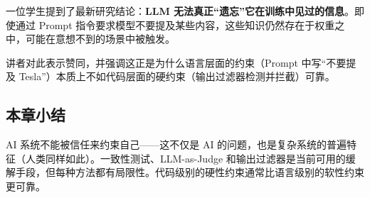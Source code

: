 一位学生提到了最新研究结论：\textbf{LLM 无法真正``遗忘''它在训练中见过的信息}。即使通过 Prompt 指令要求模型不要提及某些内容，这些知识仍然存在于权重之中，可能在意想不到的场景中被触发。

讲者对此表示赞同，并强调这正是为什么语言层面的约束（Prompt 中写``不要提及 Tesla''）本质上不如代码层面的硬约束（输出过滤器检测并拦截）可靠。

\subsection{本章小结}

AI 系统不能被信任来约束自己——这不仅是 AI 的问题，也是复杂系统的普遍特征（人类同样如此）。一致性测试、LLM-as-Judge 和输出过滤器是当前可用的缓解手段，但每种方法都有局限性。代码级别的硬性约束通常比语言级别的软性约束更可靠。

